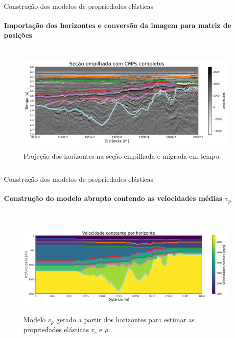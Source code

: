 \documentclass[xcolor=dvipsnames,t]{beamer}
\begin{document}
\begin{frame}{Construção dos modelos de propriedades elásticas}
	\framesubtitle{Importação dos horizontes e conversão da imagem para matriz de posições}	
		
	\begin{columns}[onlytextwidth, T]
		\begin{column}{.9\textwidth}
			\begin{figure}[h]
				\includegraphics[width=11cm,height=5cm]{../imagens/sectionHrz.png}	
				\tiny{\caption{Projeção dos horizontes na seção empilhada e migrada em tempo.}} 	
			\end{figure}			
		\end{column}
	\end{columns}	
	
\end{frame}
\begin{frame}{Construção dos modelos de propriedades elásticas}
	\framesubtitle{Construção do modelo abrupto contendo as velocidades médias $v_p$}	
		
	\begin{columns}[onlytextwidth, T]
		\begin{column}{.9\textwidth}
			\begin{figure}[h]
				\includegraphics[width=11cm,height=5cm]{../imagens/modeloAbrupto.png}	
				\tiny{\caption{Modelo $v_p$ gerado a partir dos horizontes para estimar as propriedades elásticas $v_s$ e $\rho$.}} 	
			\end{figure}			
		\end{column}
	\end{columns}	
	
\end{frame}
\end{document}
